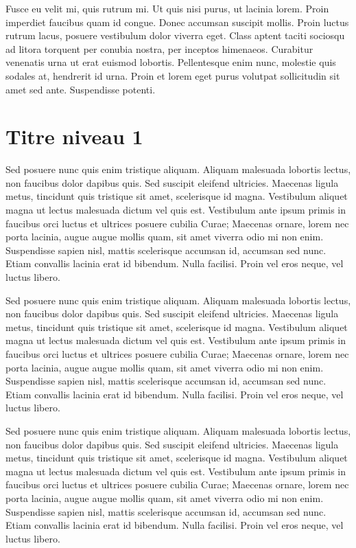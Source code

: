 \documentclass{FramateX}
\begin{document}
\begin{refsection}
Fusce eu velit mi, quis rutrum mi. Ut quis nisi purus, ut lacinia lorem. Proin imperdiet faucibus quam id congue. Donec accumsan suscipit mollis. Proin luctus rutrum lacus, posuere vestibulum dolor viverra eget. Class aptent taciti sociosqu ad litora torquent per conubia nostra, per inceptos himenaeos. Curabitur venenatis urna ut erat euismod lobortis. Pellentesque enim nunc, molestie quis sodales at, hendrerit id urna. Proin et lorem eget purus volutpat sollicitudin sit amet sed ante. Suspendisse potenti.

\section*{Titre niveau 1}
{}

Sed posuere nunc quis enim tristique aliquam. Aliquam malesuada lobortis lectus, non faucibus dolor dapibus quis. Sed suscipit eleifend ultricies. Maecenas ligula metus, tincidunt quis tristique sit amet, scelerisque id magna. Vestibulum aliquet magna ut lectus malesuada dictum vel quis est. Vestibulum ante ipsum primis in faucibus orci luctus et ultrices posuere cubilia Curae; Maecenas ornare, lorem nec porta lacinia, augue augue mollis quam, sit amet viverra odio mi non enim. Suspendisse sapien nisl, mattis scelerisque accumsan id, accumsan sed nunc. Etiam convallis lacinia erat id bibendum. Nulla facilisi. Proin vel eros neque, vel luctus libero.


Sed posuere nunc quis enim tristique aliquam. Aliquam malesuada lobortis lectus, non faucibus dolor dapibus quis. Sed suscipit eleifend ultricies. Maecenas ligula metus, tincidunt quis tristique sit amet, scelerisque id magna. Vestibulum aliquet magna ut lectus malesuada dictum vel quis est. Vestibulum ante ipsum primis in faucibus orci luctus et ultrices posuere cubilia Curae; Maecenas ornare, lorem nec porta lacinia, augue augue mollis quam, sit amet viverra odio mi non enim. Suspendisse sapien nisl, mattis scelerisque accumsan id, accumsan sed nunc. Etiam convallis lacinia erat id bibendum. Nulla facilisi. Proin vel eros neque, vel luctus libero.


Sed posuere nunc quis enim tristique aliquam. Aliquam malesuada lobortis lectus, non faucibus dolor dapibus quis. Sed suscipit eleifend ultricies. Maecenas ligula metus, tincidunt quis tristique sit amet, scelerisque id magna. Vestibulum aliquet magna ut lectus malesuada dictum vel quis est. Vestibulum ante ipsum primis in faucibus orci luctus et ultrices posuere cubilia Curae; Maecenas ornare, lorem nec porta lacinia, augue augue mollis quam, sit amet viverra odio mi non enim. Suspendisse sapien nisl, mattis scelerisque accumsan id, accumsan sed nunc. Etiam convallis lacinia erat id bibendum. Nulla facilisi. Proin vel eros neque, vel luctus libero.



\end{refsection}
\end{document}
